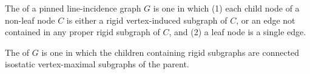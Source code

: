 
\begin{definition}
    The  of a  pinned line-incidence graph $G$ is one in which (1) each child node of a non-leaf node $C$ is either a  rigid vertex-induced subgraph of $C$, or an edge not contained in any  proper rigid subgraph of $C$, and (2) a leaf node is a single edge.

    The  of $G$  is one in which the  children containing rigid subgraphs are connected isostatic vertex-maximal subgraphs of the parent.
\end{definition}


